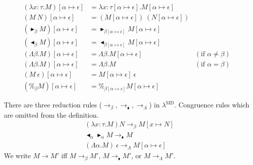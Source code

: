 \documentclass[runningheads]{llncs}
\newcommand{\LMD}{$\lambda^{\textrm{MD}}$\xspace}
\newcommand{\TB}{\blacktriangleright}
\newcommand{\TBL}{\blacktriangleleft}
\begin{document}
\begin{align*}
	(\lambda x:\tau.M)[\alpha \mapsto \epsilon] & = \lambda x:\tau[\alpha \mapsto \epsilon].M[\alpha \mapsto \epsilon]                                  \\
	(M\ N)[\alpha \mapsto \epsilon]             & = (M[\alpha \mapsto \epsilon])\ (N[\alpha \mapsto \epsilon])                                          \\
	(\TB_\beta M)[\alpha \mapsto \epsilon]      & = \TB_{\beta[\alpha \mapsto \epsilon]} M[\alpha \mapsto \epsilon]                                     \\
	(\TBL_\beta M)[\alpha \mapsto \epsilon]     & = \TBL_{\beta[\alpha \mapsto \epsilon]} M[\alpha \mapsto \epsilon]                                    \\
	(\Lambda\beta.M)[\alpha \mapsto \epsilon]   & = \Lambda\beta.M[\alpha \mapsto \epsilon]                            & (\text{if } \alpha \neq \beta) \\
	(\Lambda\beta.M)[\alpha \mapsto \epsilon]   & = \Lambda\beta.M                                                     & (\text{if } \alpha = \beta)    \\
	(M\ \epsilon)[\alpha \mapsto \epsilon]      & = M[\alpha \mapsto \epsilon]\ \epsilon                                                                \\
	(\%_\beta M)[\alpha \mapsto \epsilon]       & = \%_{\beta[\alpha \mapsto \epsilon]}M[\alpha \mapsto \epsilon] 
\end{align*}

\begin{definition}[Reduction]
	There are three reduction rules ($\longrightarrow_\beta, \longrightarrow_\blacklozenge, \longrightarrow_\Lambda$) in \LMD.
	Congruence rules which are omitted from the definition.
	\begin{align*}
		 & (\lambda x:\tau.M) N \longrightarrow_\beta M[x \mapsto N]                       \\
		 & \TBL_\alpha \TB_\alpha M \longrightarrow_\blacklozenge M                        \\
		 & (\Lambda \alpha.M)\ \epsilon \longrightarrow_\Lambda M[\alpha \mapsto \epsilon]
	\end{align*}
	We write $ M \longrightarrow M'$ iff $ M \longrightarrow_\beta M'$, $ M \longrightarrow_\blacklozenge M'$, or $ M \longrightarrow_\Lambda M'$.
\end{definition}
\end{document}

